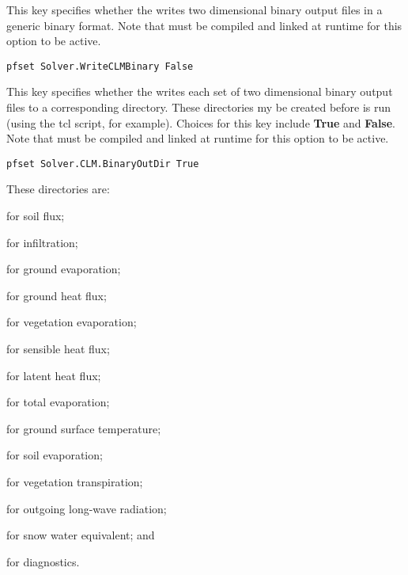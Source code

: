 {This key specifies whether the  writes two dimensional binary output files in a generic binary format.
 Note that  must be compiled and linked at runtime for this option to be active.
}
\begin{display}\begin{verbatim}
pfset Solver.WriteCLMBinary False
\end{verbatim}\end{display}

{This key specifies whether the  writes each set of two dimensional binary output files to a corresponding directory.
These directories my be created before \parflow{} is run (using the tcl script, for example).  Choices for this key include {\bf True} and {\bf False}. Note that  must be compiled and linked at runtime for this option to be active.
}
\begin{display}\begin{verbatim}
pfset Solver.CLM.BinaryOutDir True
\end{verbatim}\end{display}
These directories are:
\begin{description}
\item {} for soil flux;
\item {} for infiltration;
\item {} for ground evaporation;
\item {} for ground heat flux;
\item {} for vegetation evaporation;
\item {} for sensible heat flux;
\item {} for latent heat flux;
\item {} for total evaporation;
\item {} for ground surface temperature;
\item {} for soil evaporation;
\item {} for vegetation transpiration;
\item {} for outgoing long-wave radiation;
\item {} for snow water equivalent; and
\item {} for diagnostics.
\end{description}

